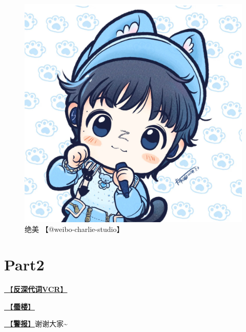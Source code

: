 \documentclass[]{ctexbook}
\begin{document}
\begin{figure}

{\centering \includegraphics[width=400pt]{img/guiyang20240713/001} 

}

\caption{绝美 【@weibo-charlie-studio】}\label{fig:unnamed-chunk-59}
\end{figure}

\section{Part2}\label{guiyang-20240713-part2}

\hyperref[senself-vcr]{🎥【\textbf{反深代词VCR}】}

\hyperref[mirage]{🎵【\textbf{蜃楼}】}

\hyperref[the-giver]{🎵【\textbf{警报}】}谢谢大家\textasciitilde{}
\end{document}
